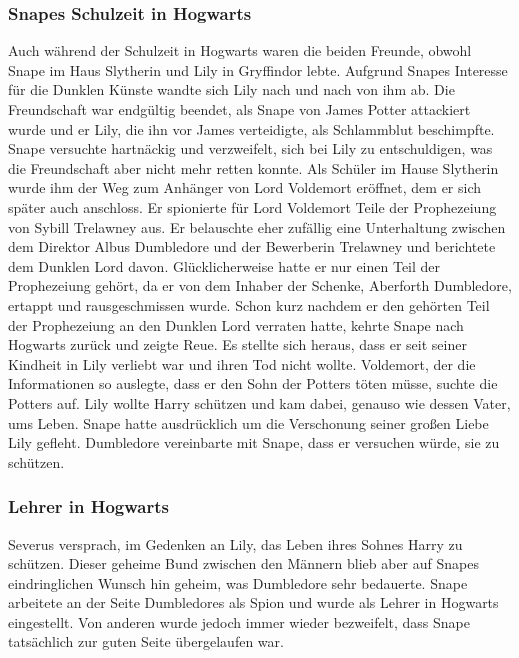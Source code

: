\documentclass[a4paper, 10pt]{article}
\begin{document}
\subsubsection*{\large Snapes Schulzeit in Hogwarts}
Auch während der Schulzeit in Hogwarts waren die beiden Freunde, obwohl Snape im Haus Slytherin und Lily in Gryffindor lebte. Aufgrund Snapes Interesse für die Dunklen Künste wandte sich Lily nach und nach von ihm ab. Die Freundschaft war endgültig beendet, als Snape von James Potter attackiert wurde und er Lily, die ihn vor James verteidigte, als Schlammblut beschimpfte. Snape versuchte hartnäckig und verzweifelt, sich bei Lily zu entschuldigen, was die Freundschaft aber nicht mehr retten konnte.
\vspace{10pt}
\newline
Als Schüler im Hause Slytherin wurde ihm der Weg zum Anhänger von Lord Voldemort eröffnet, dem er sich später auch anschloss. Er spionierte für Lord Voldemort Teile der Prophezeiung von Sybill Trelawney aus. Er belauschte eher zufällig eine Unterhaltung zwischen dem Direktor Albus Dumbledore und der Bewerberin Trelawney und berichtete dem Dunklen Lord davon. Glücklicherweise hatte er nur einen Teil der Prophezeiung gehört, da er von dem Inhaber der Schenke, Aberforth Dumbledore, ertappt und rausgeschmissen wurde. Schon kurz nachdem er den gehörten Teil der Prophezeiung an den Dunklen Lord verraten hatte, kehrte Snape nach Hogwarts zurück und zeigte Reue. Es stellte sich heraus, dass er seit seiner Kindheit in Lily verliebt war und ihren Tod nicht wollte. Voldemort, der die Informationen so auslegte, dass er den Sohn der Potters töten müsse, suchte die Potters auf. Lily wollte Harry schützen und kam dabei, genauso wie dessen Vater, ums Leben. Snape hatte ausdrücklich um die Verschonung seiner großen Liebe Lily gefleht. Dumbledore vereinbarte mit Snape, dass er versuchen würde, sie zu schützen.

\subsubsection*{\large Lehrer in Hogwarts}
Severus versprach, im Gedenken an Lily, das Leben ihres Sohnes Harry zu schützen. Dieser geheime Bund zwischen den Männern blieb aber auf Snapes eindringlichen Wunsch hin geheim, was Dumbledore sehr bedauerte. Snape arbeitete an der Seite Dumbledores als Spion und wurde als Lehrer in Hogwarts eingestellt. Von anderen wurde jedoch immer wieder bezweifelt, dass Snape tatsächlich zur guten Seite übergelaufen war.
\end{document}
